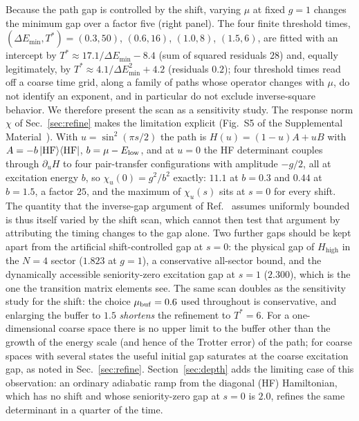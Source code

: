 \documentclass[
  aps,            %
  prc,            %
  reprint,        %
  superscriptaddress,
  floatfix,
  nofootinbib
]{revtex4-2}
\newcommand{\Hhigh}{H_{\mathrm{high}}}
\newcommand{\SM}{Supplemental Material~\cite{SM}}
\begin{document}
Because the path gap is controlled by the shift, varying $\mu$ at fixed $g=1$
changes the minimum gap over a factor five (right panel).  The four finite
threshold times, $(\Delta E_{\min},T^{*})=(0.3,50)$, $(0.6,16)$, $(1.0,8)$,
$(1.5,6)$, are fitted with an intercept by $T^{*}\approx17.1/\Delta E_{\min}-8.4$
(sum of squared residuals $28$) and, equally legitimately, by
$T^{*}\approx4.1/\Delta E_{\min}^{2}+4.2$ (residuals $0.2$); four threshold
times read off a coarse time grid, along a family of paths whose operator
changes with $\mu$, do not identify an exponent, and in particular do not
exclude inverse-square behavior.  We therefore present the scan as a
sensitivity study.  The response norm $\chi$ of Sec.~\ref{sec:refine} makes
the limitation explicit (Fig.~S5 of the \SM{}).  With
$u=\sin^2(\pi s/2)$ the path is $H(u)=(1-u)A+uB$ with
$A=-b\ket{\rm HF}\!\bra{\rm HF}$, $b=\mu-E_{\rm low}$, and at $u=0$ the HF
determinant couples through $\partial_uH$ to four pair-transfer
configurations with amplitude $-g/2$, all at excitation energy $b$, so
$\chi_u(0)=g^2/b^2$ exactly: $11.1$ at $b=0.3$ and $0.44$ at $b=1.5$, a
factor $25$, and the maximum of $\chi_u(s)$ sits at $s=0$ for every shift.
The quantity that the inverse-gap argument of Ref.~\cite{Bogner2026} assumes
uniformly bounded is thus itself varied by the shift scan, which cannot then
test that argument by attributing the timing changes to the gap alone.  Two
further gaps should be kept apart from the artificial shift-controlled gap
at $s=0$: the physical gap of $\Hhigh$ in the $N=4$ sector ($1.823$ at
$g=1$), a conservative all-sector bound, and the dynamically accessible
seniority-zero excitation gap at $s=1$ ($2.300$), which is the one the
transition matrix elements see.  The same scan doubles as the sensitivity
study for the shift: the choice $\mu_{\rm buf}=0.6$ used throughout is
conservative, and enlarging the buffer to $1.5$ \emph{shortens} the
refinement to $T^{*}=6$.  For a one-dimensional coarse space there is no
upper limit to the buffer other than the growth of the energy scale (and
hence of the Trotter error) of the path; for coarse spaces with several
states the useful initial gap saturates at the coarse excitation gap, as
noted in Sec.~\ref{sec:refine}.  Section~\ref{sec:depth} adds the limiting
case of this observation: an ordinary adiabatic ramp from the diagonal
(HF) Hamiltonian, which has no shift and whose seniority-zero gap at $s=0$
is $2.0$, refines the same determinant in a quarter of the time.
\end{document}
